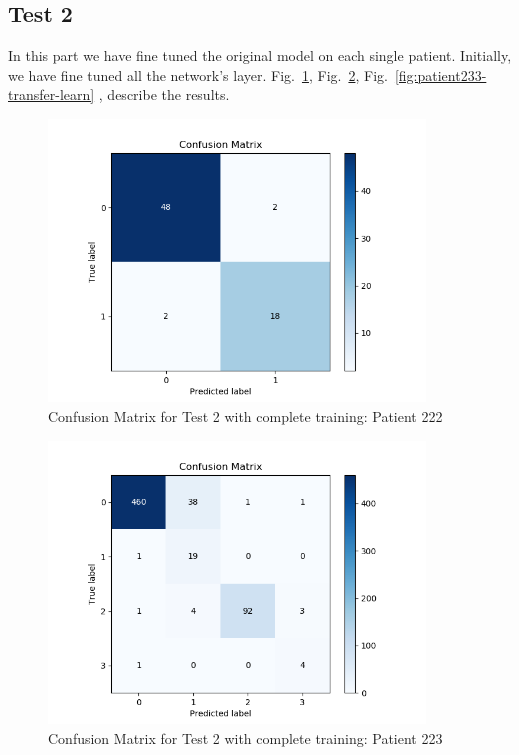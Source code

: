 \documentclass[LaM,binding=0.6cm]{sapthesis}
\begin{document}
\subsection{Test 2}
In this part we have fine tuned the original model on each single patient. Initially, we have fine tuned all the network's layer. Fig.~\ref{fig:patient222-transfer-learn}, Fig.~\ref{fig:patient223-transfer-learn}, Fig.~\ref{fig:patient233-transfer-learn} , describe the results.
\begin{figure}  \centering
    \includegraphics[width=100mm,scale=0.7]{patient222-transfer-learn}
    \caption{Confusion Matrix for Test 2 with complete training: Patient 222}
    \label{fig:patient222-transfer-learn}
\end{figure}
\begin{figure}  \centering
    \includegraphics[width=100mm,scale=0.7]{patient223-transfer-learn}
    \caption{Confusion Matrix for Test 2 with complete training: Patient 223}
    \label{fig:patient223-transfer-learn}
\end{figure}
\end{document}
